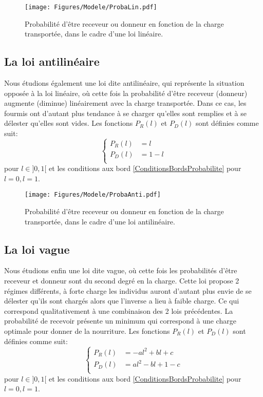 \begin{figure}[h]
\centering
\texttt{[image: Figures/Modele/ProbaLin.pdf]}
\caption{Probabilité d'être receveur ou donneur en fonction de la charge transportée, dans le cadre d'une loi linéaire.}
\label{ProbaLin}
\end{figure}


\subsection{La loi antilinéaire}
Nous étudions également une loi dite antilinéaire, qui représente la situation opposée à la loi linéaire, où cette fois la probabilité d'être receveur (donneur) augmente (diminue) linéairement avec la charge transportée. Dans ce cas, les fourmis ont d'autant plus tendance à se charger qu'elles sont remplies et à se délester qu'elles sont vides. Les fonctions $P_R(l)$ et $P_D(l)$ sont définies comme suit:
\begin{equation}
\left \{
\begin{aligned}
P_R (l) &= l\\
P_D (l) &= 1-l\\
\end{aligned}
\right.
\label{PRAnti}
\end{equation}
pour $l\in]0,1[$ et les conditions aux bord \ref{ConditionsBordsProbabilite} pour $l=0, l=1$.

\begin{figure}[h]
\centering
\texttt{[image: Figures/Modele/ProbaAnti.pdf]}
\caption{Probabilité d'être receveur ou donneur en fonction de la charge transportée, dans le cadre d'une loi antilinéaire.}
\label{ProbaAnti}
\end{figure}

\subsection{La loi vague}
Nous étudions enfin une loi dite vague, où cette fois les probabilités d'être receveur et donneur sont du second degré en la charge. Cette loi propose 2 régimes différents, à forte charge les individus auront d'autant plus envie de se délester qu'ils sont chargés alors que l'inverse a lieu à faible charge. Ce qui correspond qualitativement à une combinaison des 2 lois précédentes. La probabilité de recevoir présente un minimum qui correspond à une charge optimale pour donner de la nourriture. Les fonctions $P_R(l)$ et $P_D(l)$ sont définies comme suit:
\begin{equation}
\left \{
\begin{aligned}
P_R (l) &= -al^2+bl+c\\
P_D (l) &= al^2-bl+1-c\\
\end{aligned}
\right.
\label{PRVague}
\end{equation}
pour $l\in]0,1[$ et les conditions aux bord \ref{ConditionsBordsProbabilite} pour $l=0, l=1$.\\

